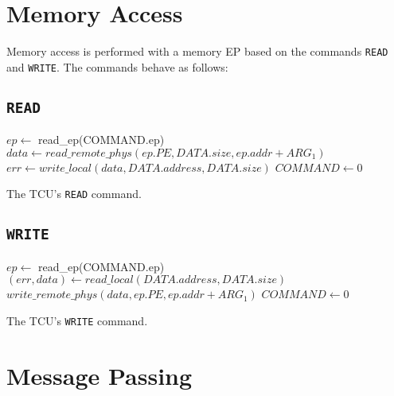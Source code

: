 \section{Memory Access}

Memory access is performed with a memory EP based on the commands \texttt{READ} and \texttt{WRITE}.
The commands behave as follows:

\subsection{\texttt{READ}}

\begin{algorithm}[H]
    $ep \gets$ read\_ep(COMMAND.ep)\;
    \extend{}
    \BlankLine
    $data \gets read\_remote\_phys(ep.PE, DATA.size, ep.addr + ARG_1)$\;
    $err \gets write\_local(data, DATA.address, DATA.size)$\;
    \extend{}
    $COMMAND \gets 0$\;
    \caption{The TCU's \texttt{READ} command.}
\end{algorithm}

\subsection{\texttt{WRITE}}

\begin{algorithm}[H]
    $ep \gets$ read\_ep(COMMAND.ep)\;
    \extend{}
    \BlankLine
    $(err, data) \gets read\_local(DATA.address, DATA.size)$\;
    \extend{}
    $write\_remote\_phys(data, ep.PE, ep.addr + ARG_1)$\;
    \BlankLine
    $COMMAND \gets 0$\;
    \caption{The TCU's \texttt{WRITE} command.}
\end{algorithm}

\section{Message Passing}


